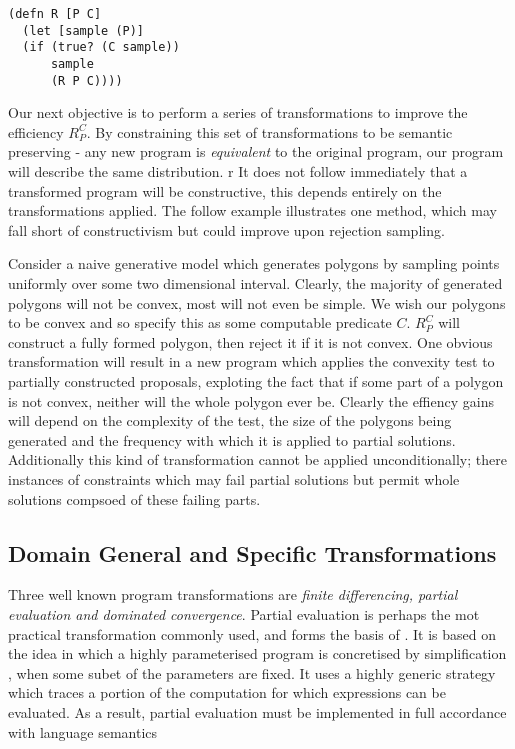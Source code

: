 \begin{verbatim}
(defn R [P C]
  (let [sample (P)]
  (if (true? (C sample))
      sample
      (R P C))))
\end{verbatim}

Our next objective is to perform a series of transformations to improve the efficiency $R_P^C$.
By constraining this set of transformations to be semantic preserving - any new program is \textit{equivalent} to the original program, our program will describe the same distribution.
r
It does not follow immediately that a transformed program will be constructive, this depends entirely on the transformations applied.
The follow example illustrates one method, which may fall short of constructivism but could improve upon rejection sampling.

Consider a naive generative model which generates polygons by sampling points uniformly over some two dimensional interval.
Clearly, the majority of generated polygons will not be convex, most will not even be simple.
We wish our polygons to be convex and so specify this as some computable predicate $C$.
$R_P^C$  will construct a fully formed polygon, then reject it if it is not convex.
One obvious transformation will result in a new program which applies the convexity test to partially constructed proposals, exploting the fact that if some part of a polygon is not convex, neither will the whole polygon ever be.
Clearly the effiency gains will depend on the complexity of the test, the size of the polygons being generated and the frequency with which it is applied to partial solutions.
Additionally this kind of transformation cannot be applied unconditionally; there instances of constraints which may fail partial solutions but permit whole solutions compsoed of these failing parts.

\subsection{Domain General and Specific Transformations}

Three well known program transformations are \textit{finite differencing, partial evaluation and dominated convergence}.
Partial evaluation \citep{paige} is perhaps the mot practical transformation commonly used, and forms the basis of .
It is based on the idea in which a highly parameterised program is concretised by simplification , when some subet of the parameters are fixed.
It uses a highly generic strategy which traces a portion of the computation for which expressions can be evaluated.
As a result, partial evaluation must be implemented in full accordance with language semantics

